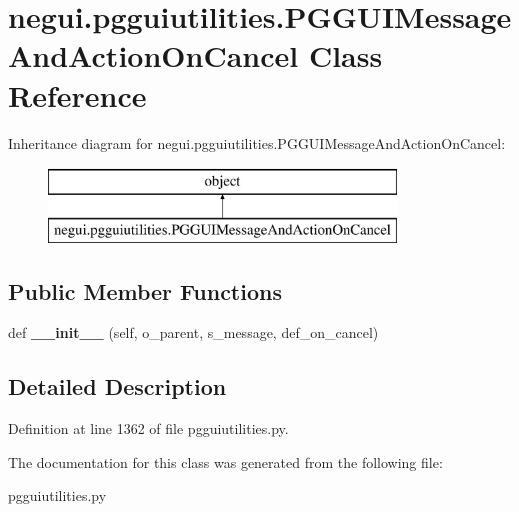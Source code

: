 \hypertarget{classnegui_1_1pgguiutilities_1_1PGGUIMessageAndActionOnCancel}{}\section{negui.\+pgguiutilities.\+P\+G\+G\+U\+I\+Message\+And\+Action\+On\+Cancel Class Reference}
\label{classnegui_1_1pgguiutilities_1_1PGGUIMessageAndActionOnCancel}
Inheritance diagram for negui.\+pgguiutilities.\+P\+G\+G\+U\+I\+Message\+And\+Action\+On\+Cancel\+:\begin{figure}[H]
\begin{center}
\leavevmode
\includegraphics[height=2.000000cm]{classnegui_1_1pgguiutilities_1_1PGGUIMessageAndActionOnCancel}
\end{center}
\end{figure}
\subsection*{Public Member Functions}
\begin{DoxyCompactItemize}
\item 
def {\bfseries \+\_\+\+\_\+init\+\_\+\+\_\+} (self, o\+\_\+parent, s\+\_\+message, def\+\_\+on\+\_\+cancel)\hypertarget{classnegui_1_1pgguiutilities_1_1PGGUIMessageAndActionOnCancel_a4274202cb2f6a6ef64a3928c9d433aff}{}\label{classnegui_1_1pgguiutilities_1_1PGGUIMessageAndActionOnCancel_a4274202cb2f6a6ef64a3928c9d433aff}

\end{DoxyCompactItemize}


\subsection{Detailed Description}


Definition at line 1362 of file pgguiutilities.\+py.



The documentation for this class was generated from the following file\+:\begin{DoxyCompactItemize}
\item 
pgguiutilities.\+py\end{DoxyCompactItemize}
